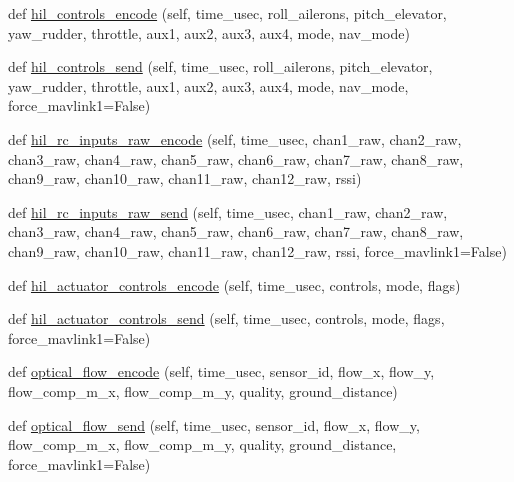 \begin{DoxyCompactItemize}
\item 
def \hyperlink{classpymavlink_1_1dialects_1_1v10_1_1MAVLink_a2f475bf378f269fd0cc103b6b2ac4acc}{hil\+\_\+controls\+\_\+encode} (self, time\+\_\+usec, roll\+\_\+ailerons, pitch\+\_\+elevator, yaw\+\_\+rudder, throttle, aux1, aux2, aux3, aux4, mode, nav\+\_\+mode)
\item 
def \hyperlink{classpymavlink_1_1dialects_1_1v10_1_1MAVLink_ac40f22199a95772faabdb88e7281e01a}{hil\+\_\+controls\+\_\+send} (self, time\+\_\+usec, roll\+\_\+ailerons, pitch\+\_\+elevator, yaw\+\_\+rudder, throttle, aux1, aux2, aux3, aux4, mode, nav\+\_\+mode, force\+\_\+mavlink1=False)
\item 
def \hyperlink{classpymavlink_1_1dialects_1_1v10_1_1MAVLink_a97d8e8552503da0aef7573b0375b24fa}{hil\+\_\+rc\+\_\+inputs\+\_\+raw\+\_\+encode} (self, time\+\_\+usec, chan1\+\_\+raw, chan2\+\_\+raw, chan3\+\_\+raw, chan4\+\_\+raw, chan5\+\_\+raw, chan6\+\_\+raw, chan7\+\_\+raw, chan8\+\_\+raw, chan9\+\_\+raw, chan10\+\_\+raw, chan11\+\_\+raw, chan12\+\_\+raw, rssi)
\item 
def \hyperlink{classpymavlink_1_1dialects_1_1v10_1_1MAVLink_a4c417fef006f127caae7f93f769d1d62}{hil\+\_\+rc\+\_\+inputs\+\_\+raw\+\_\+send} (self, time\+\_\+usec, chan1\+\_\+raw, chan2\+\_\+raw, chan3\+\_\+raw, chan4\+\_\+raw, chan5\+\_\+raw, chan6\+\_\+raw, chan7\+\_\+raw, chan8\+\_\+raw, chan9\+\_\+raw, chan10\+\_\+raw, chan11\+\_\+raw, chan12\+\_\+raw, rssi, force\+\_\+mavlink1=False)
\item 
def \hyperlink{classpymavlink_1_1dialects_1_1v10_1_1MAVLink_a11666b39c56f547eca6e490c8289b9a9}{hil\+\_\+actuator\+\_\+controls\+\_\+encode} (self, time\+\_\+usec, controls, mode, flags)
\item 
def \hyperlink{classpymavlink_1_1dialects_1_1v10_1_1MAVLink_af6832396b371d4808ef540bb2c424d1e}{hil\+\_\+actuator\+\_\+controls\+\_\+send} (self, time\+\_\+usec, controls, mode, flags, force\+\_\+mavlink1=False)
\item 
def \hyperlink{classpymavlink_1_1dialects_1_1v10_1_1MAVLink_a26f4306f2014708c90a4a39a3ae4ba66}{optical\+\_\+flow\+\_\+encode} (self, time\+\_\+usec, sensor\+\_\+id, flow\+\_\+x, flow\+\_\+y, flow\+\_\+comp\+\_\+m\+\_\+x, flow\+\_\+comp\+\_\+m\+\_\+y, quality, ground\+\_\+distance)
\item 
def \hyperlink{classpymavlink_1_1dialects_1_1v10_1_1MAVLink_abc9c3e35510666e71ae6e98b7d3f4ada}{optical\+\_\+flow\+\_\+send} (self, time\+\_\+usec, sensor\+\_\+id, flow\+\_\+x, flow\+\_\+y, flow\+\_\+comp\+\_\+m\+\_\+x, flow\+\_\+comp\+\_\+m\+\_\+y, quality, ground\+\_\+distance, force\+\_\+mavlink1=False)

\end{DoxyCompactItemize}
